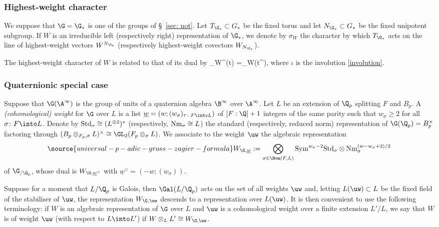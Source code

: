 \subsubsection{Highest-weight character} We suppose that $\G=\G_{*}$ is one of the groups of \S~\ref{sec: not}.
Let  $T_{\G_{*}}\subset G_{*}$ be the fixed  torus and let $N_{\G_{*}}\subset G_{*}$ be the fixed unipotent subgroup. If $W$ is an irreducible left  (respectively right) representation of $\G_{*}$, we denote by $\sigma_{W}$ the character by which $T_{\G_{*}}$ acts on the line  of highest-weight vectors $W^{N_{\G_{*}}}$ (respectively highest-weight covectors $W_{N_{\G_{*}}}$).

The highest-weight character of $W$ is related to that of its  dual by
\beq \label{highest weight}
\sigma_{W^{\vee}}(t)
=\sigma_{W}(t^{\iota}),
\eeq
where ${\iota}$ is the involution \eqref{involution}.





\subsubsection{Quaternionic  special case} Suppose that $\G(\A^{\infty})$ is
 the group of units of a quaternion algebra  $\B^{\infty}$ over $\A^{\infty}$.
Let $L$  be an extension of $\Q_{p}$ splitting $F$ and $B_{p}$.  A \emph{(cohomological)  weight} for $\G$ over $L$ is a list  $\underline{w}=(w; (w_{\sigma})_{\tau\colon F\into L})$ of   $[F:\Q]+1$ integers  of the same parity such that $w_{\sigma}\geq 2$ for all $\sigma\colon F\into L$. Denote by ${\rm Std}_{\sigma}\cong (L^{\oplus 2})^{*}$ (respectively, ${\rm Nm}_{\sigma}\cong L$) the standard (respectively, reduced norm) representation of ${\G}(\Q_{p})=B_{p}^{\times}$ factoring through $(B_{p}\otimes_{F_{p}, \sigma} L)^{\times}\cong \GL_{2}(F_{p}\otimes_{\sigma} L)$. We associate to the weight $\uw$ the algebraic representation
\begin{align}\label{Ww}
\source{universal-p-adic-gross-zagier-formula}
W_{{\G},\underline{w}}:= \bigotimes_{\sigma\in \Hom(F, L)}{\rm Sym}^{w_{\sigma}-2}{\rm Std}_{\sigma}\otimes {\rm Nm}_{\sigma}^{(w-w_{\sigma}+2)/2}
\end{align}
of $\G_{/\Q_{p}}$, whose dual is $W_{\G, \underline{w}^{\vee}}$ with $\underline{w}^{\vee}=(-w; (w_{\sigma}))$.

 Suppose for a moment  that $L/\Q_{p}$ is Galois, then  $\Gal(L/\Q_{p})$ acts on the set of all weights $\uw$ and,   letting $L(\uw)\subset L$ be the fixed field of the stabiliser of $\uw$,
 the representation $W_{\G, \uw}$ descends to a representation
 over $L(\uw)$.  It is then  convenient to use the following terminology: if $W$ is an algebraic representation of $\G$ over $L$ and $\uw$ is a cohomological weight over a finite extension $L'/L$, we say that $W$ is of weight $\uw$ (with respect to $L\into L'$) if $W\otimes_{L}L' \cong W_{\G,\uw}$.



